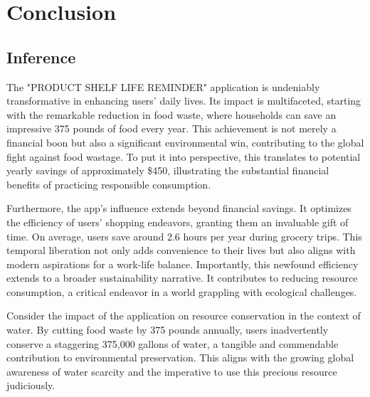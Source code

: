 \chapter{Conclusion}
\section{Inference}

The "PRODUCT SHELF LIFE REMINDER" application is undeniably transformative in enhancing users' daily lives. Its impact is multifaceted, starting with the remarkable reduction in food waste, where households can save an impressive 375 pounds of food every year. This achievement is not merely a financial boon but also a significant environmental win, contributing to the global fight against food wastage. To put it into perspective, this translates to potential yearly savings of approximately \$450, illustrating the substantial financial benefits of practicing responsible consumption.

Furthermore, the app's influence extends beyond financial savings. It optimizes the efficiency of users' shopping endeavors, granting them an invaluable gift of time. On average, users save around 2.6 hours per year during grocery trips. This temporal liberation not only adds convenience to their lives but also aligns with modern aspirations for a work-life balance. Importantly, this newfound efficiency extends to a broader sustainability narrative. It contributes to reducing resource consumption, a critical endeavor in a world grappling with ecological challenges.

Consider the impact of the application on resource conservation in the context of water. By cutting food waste by 375 pounds annually, users inadvertently conserve a staggering 375,000 gallons of water, a tangible and commendable contribution to environmental preservation. This aligns with the growing global awareness of water scarcity and the imperative to use this precious resource judiciously.
